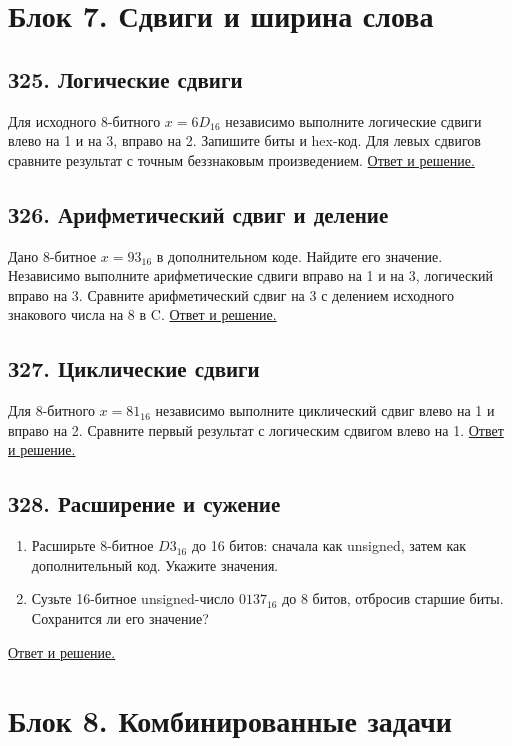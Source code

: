 \section{Блок 7. Сдвиги и ширина слова}
\subsection*{З25. Логические сдвиги}\label{task:z25}
Для исходного 8-битного $x=6D_{16}$ независимо выполните логические сдвиги влево на 1 и на 3, вправо на 2. Запишите биты и hex-код. Для левых сдвигов сравните результат с точным беззнаковым произведением.
\hyperref[ans:z25]{Ответ и решение.}

\subsection*{З26. Арифметический сдвиг и деление}\label{task:z26}
Дано 8-битное $x=93_{16}$ в дополнительном коде. Найдите его значение. Независимо выполните арифметические сдвиги вправо на 1 и на 3, логический вправо на 3. Сравните арифметический сдвиг на 3 с делением исходного знакового числа на 8 в C.
\hyperref[ans:z26]{Ответ и решение.}

\subsection*{З27. Циклические сдвиги}\label{task:z27}
Для 8-битного $x=81_{16}$ независимо выполните циклический сдвиг влево на 1 и вправо на 2. Сравните первый результат с логическим сдвигом влево на 1.
\hyperref[ans:z27]{Ответ и решение.}

\subsection*{З28. Расширение и сужение}\label{task:z28}
\begin{enumerate}
    \item Расширьте 8-битное $D3_{16}$ до 16 битов: сначала как unsigned, затем как дополнительный код. Укажите значения.
    \item Сузьте 16-битное unsigned-число $0137_{16}$ до 8 битов, отбросив старшие биты. Сохранится ли его значение?
\end{enumerate}
\hyperref[ans:z28]{Ответ и решение.}

\section{Блок 8. Комбинированные задачи}
